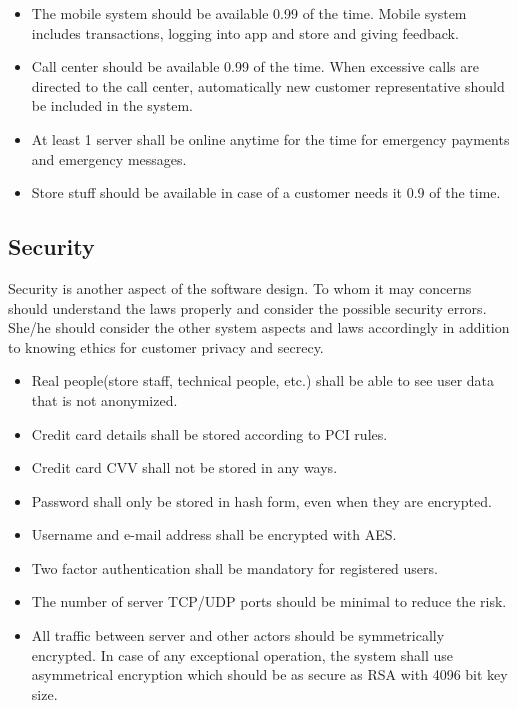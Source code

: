 \begin{itemize}
    \item The mobile system should be available 0.99 of the time. Mobile system includes transactions, logging into app and store and giving feedback.
    \item Call center should be available 0.99 of the time. When excessive calls are directed to the call center, automatically new customer representative should be included in the system.
    \item At least 1 server shall be online anytime for the time for emergency payments and emergency messages.
    \item Store stuff should be available in case of a customer needs it 0.9 of the time.
\end{itemize}



\subsection{Security}
Security is another aspect of the software design. To whom it may concerns should understand the laws properly and consider the possible security errors. She/he should consider the other system aspects and laws accordingly in addition to knowing ethics for customer privacy and secrecy.


\begin{itemize}
    \item Real people(store staff, technical people, etc.) shall be able to see user data that is not anonymized.
    \item Credit card details shall be stored according to PCI rules.
    \item Credit card CVV shall not be stored in any ways.
    \item Password shall only be stored in hash form, even when they are encrypted\cite{cite:PCI_rules}.
    \item Username and e-mail address shall be encrypted with AES\cite{cite:encryption_algorithms}.
    \item Two factor authentication shall be mandatory for registered users.
    \item The number of server TCP/UDP ports should be minimal to reduce the risk.
    \item All traffic between server and other actors should be symmetrically encrypted. In case of any exceptional operation, the system shall use asymmetrical encryption which should be as secure as RSA with 4096 bit key size.
\end{itemize}